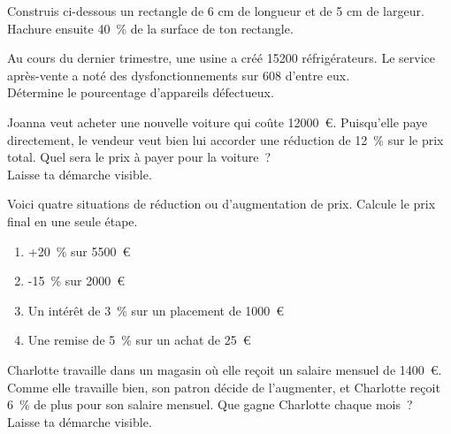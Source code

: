 \documentclass[../../syllabus_1.tex]{subfiles}
\begin{document}
\begin{exercise}
    Construis ci-dessous un rectangle de 6 cm de longueur et de 5 cm de largeur. Hachure ensuite 40~\% de la surface de ton rectangle.
    \vspace{5cm}
\end{exercise}

\begin{exercise}
    Au cours du dernier trimestre, une usine a créé \num{15200} réfrigérateurs. Le service après-vente a noté des dysfonctionnements sur 608 d'entre eux. \\
    Détermine le pourcentage d'appareils défectueux.
    \vspace{5cm}
\end{exercise}

\begin{exercise}
    Joanna veut acheter une nouvelle voiture qui coûte \num{12000}~€. Puisqu'elle paye directement, le vendeur veut bien lui accorder une réduction de 12~\% sur le prix total. Quel sera le prix à payer pour la voiture~? \\ Laisse ta démarche visible.
    \vspace{4cm}
\end{exercise}

\begin{exercise}
    Voici quatre situations de réduction ou d'augmentation de prix. Calcule le prix final en une seule étape.
    \begin{enumerate}[cols=2, itemsep=3cm]
        \item +20~\% sur \num{5500}~€
        \item -15~\% sur \num{2000}~€
        \item Un intérêt de 3~\% sur un placement de \num{1000}~€
        \item Une remise de 5~\% sur un achat de 25~€
    \end{enumerate}
    \vspace{4cm}
\end{exercise}

\begin{exercise}
    Charlotte travaille dans un magasin où elle reçoit un salaire mensuel de \num{1400}~€. Comme elle travaille bien, son patron décide de l'augmenter, et Charlotte reçoit 6~\% de plus pour son salaire mensuel. Que gagne Charlotte chaque mois~? \\ Laisse ta démarche visible.
\end{exercise}
\vfil
\end{document}
